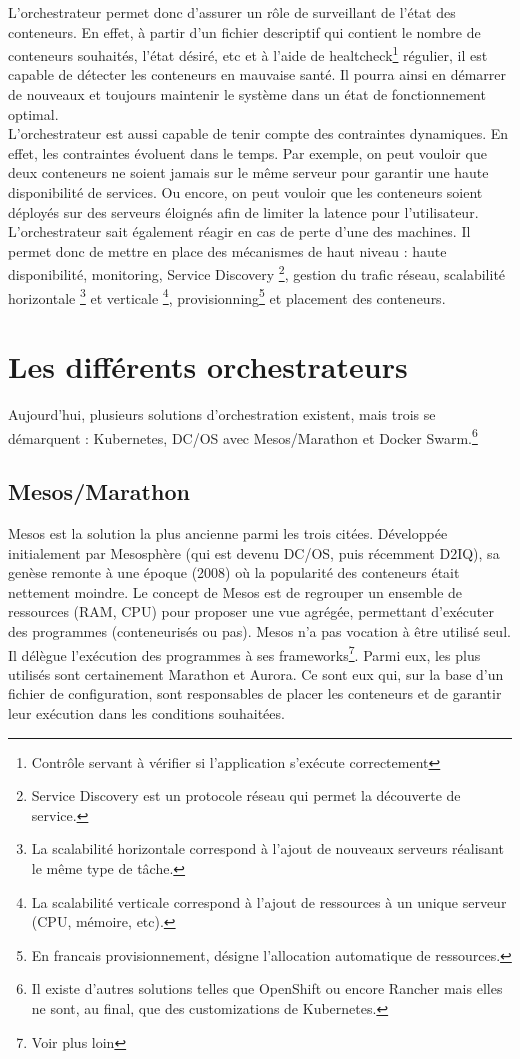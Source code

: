 \documentclass[11pt,fleqn]{book} %
\begin{document}
L'orchestrateur permet donc d'assurer un rôle de surveillant de l'état des conteneurs. En effet, à partir d'un fichier descriptif qui contient le nombre de conteneurs souhaités, l'état désiré, etc et à l'aide de healtcheck\footnote{Contrôle servant à vérifier si l'application s'exécute correctement} régulier, il est capable de détecter les conteneurs en mauvaise santé. Il pourra ainsi en démarrer de nouveaux et toujours maintenir le système dans un état de fonctionnement optimal.\\
L'orchestrateur est aussi capable de tenir compte des contraintes dynamiques. En effet, les contraintes évoluent dans le temps. Par exemple, on peut vouloir que deux conteneurs ne soient jamais sur le même serveur pour garantir une haute disponibilité de services. Ou encore, on peut vouloir que les conteneurs soient déployés sur des serveurs éloignés afin de limiter la latence pour l'utilisateur. L'orchestrateur sait également réagir en cas de perte d'une des machines. Il permet donc de mettre en place des mécanismes de haut niveau : haute disponibilité, monitoring, Service Discovery \footnote{Service Discovery est un protocole réseau qui permet la découverte de service.}, gestion du trafic réseau,  scalabilité horizontale \footnote{La scalabilité horizontale correspond à l'ajout de nouveaux serveurs réalisant le même type de tâche.} et verticale \footnote{La scalabilité verticale correspond à l'ajout de ressources à un unique serveur (CPU, mémoire, etc).}, provisionning\footnote{En francais provisionnement, désigne l'allocation automatique de ressources.} et placement des conteneurs.\\



\section{Les différents orchestrateurs}
Aujourd'hui, plusieurs solutions d'orchestration existent, mais trois se démarquent : Kubernetes, DC/OS avec Mesos/Marathon et  Docker Swarm.\footnote{Il existe d'autres solutions telles que OpenShift ou encore Rancher mais elles ne sont, au final, que des customizations de Kubernetes.}

\subsection{Mesos/Marathon}
Mesos est la solution la plus ancienne parmi les trois citées. Développée initialement par Mesosphère (qui est devenu DC/OS, puis récemment D2IQ), sa genèse remonte à une époque (2008) où la popularité des conteneurs était nettement moindre. Le concept de Mesos est de regrouper un ensemble de ressources (RAM, CPU) pour proposer une vue agrégée, permettant d’exécuter des programmes (conteneurisés ou pas). Mesos n’a pas vocation à être utilisé seul. Il délègue l’exécution des programmes à ses frameworks\footnote{Voir plus loin}. Parmi eux, les plus utilisés sont certainement Marathon et Aurora. Ce sont eux qui, sur la base d’un fichier de configuration, sont responsables de placer les conteneurs et de garantir leur exécution dans les conditions souhaitées.\\
\end{document}
